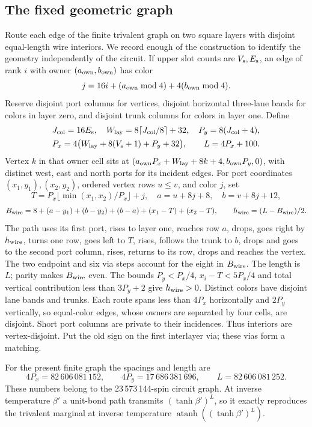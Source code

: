 \subsection{The fixed geometric graph}\label{sec:crystal-geometry}

Route each edge of the finite trivalent graph on two square layers with disjoint equal-length wire interiors. We record enough of the construction to identify the geometry independently of the circuit. If upper slot counts are \(V_{\rm s},E_{\rm s}\), an edge of rank \(i\) with owner \((a_{\rm own},b_{\rm own})\) has color
\[
 j=16i+(a_{\rm own}\bmod4)+4(b_{\rm own}\bmod4).
\]
Reserve disjoint port columns for vertices, disjoint horizontal three-lane bands for colors in layer zero, and disjoint trunk columns for colors in layer one. Define
\[
\begin{gathered}
 J_{\rm col}=16E_{\rm s},\quad W_{\rm lay}=8\lceil J_{\rm col}/8\rceil+32,
 \quad P_y=8(J_{\rm col}+4),\\
 P_x=4\bigl(W_{\rm lay}+8(V_{\rm s}+1)+P_y+32\bigr),\qquad L=4P_x+100.
\end{gathered}
\]
Vertex \(k\) in that owner cell sits at \((a_{\rm own}P_x+W_{\rm lay}+8k+4,b_{\rm own}P_y,0)\), with distinct west, east and north ports for its incident edges. For port coordinates \((x_1,y_1),(x_2,y_2)\), ordered vertex rows \(u\le v\), and color \(j\), set
\[
 T=P_x\lfloor\min(x_1,x_2)/P_x\rfloor+j,
 \quad a=u+8j+8,\quad b=v+8j+12,
\]
\[
 B_{\rm wire}=8+(a-y_1)+(b-y_2)+(b-a)+(x_1-T)+(x_2-T),
 \qquad h_{\rm wire}=(L-B_{\rm wire})/2.
\]
The path uses its first port, rises to layer one, reaches row \(a\), drops, goes right by \(h_{\rm wire}\), turns one row, goes left to \(T\), rises, follows the trunk to \(b\), drops and goes to the second port column, rises, returns to its row, drops and reaches the vertex. The two endpoint and six via steps account for the eight in \(B_{\rm wire}\). The length is \(L\); parity makes \(B_{\rm wire}\) even. The bounds \(P_y<P_x/4\), \(x_i-T<5P_x/4\) and total vertical contribution less than \(3P_y+2\) give \(h_{\rm wire}>0\). Distinct colors have disjoint lane bands and trunks. Each route spans less than \(4P_x\) horizontally and \(2P_y\) vertically, so equal-color edges, whose owners are separated by four cells, are disjoint. Short port columns are private to their incidences. Thus interiors are vertex-disjoint. Put the old sign on the first interlayer via; these vias form a matching.

For the present finite graph the spacings and length are
\begin{equation}\label{eq:wire-numbers}
 4P_x=82\,606\,081\,152,\qquad
 4P_y=17\,686\,381\,696,\qquad L=82\,606\,081\,252.
\end{equation}
These numbers belong to the 23\,573\,144-spin circuit graph. At inverse temperature \(\beta'\) a unit-bond path transmits \((\tanh\beta')^L\), so it exactly reproduces the trivalent marginal at inverse temperature \(\operatorname{atanh}((\tanh\beta')^L)\).

